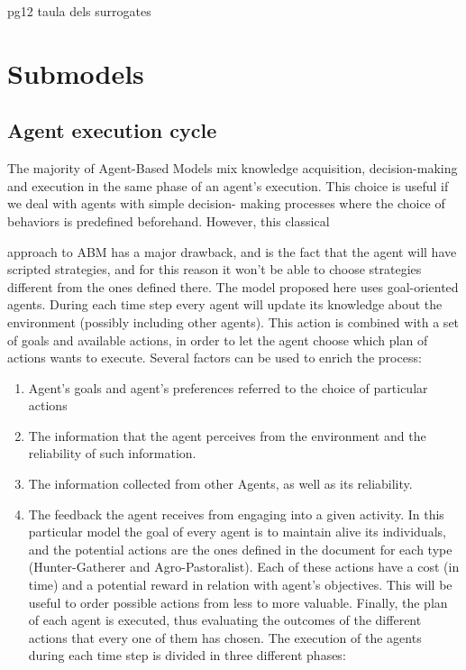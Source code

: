 pg12 taula dels surrogates

\section{Submodels}

\subsection{Agent execution cycle}
The majority of Agent-Based Models mix knowledge acquisition, decision-making and execution in the
same phase of an agent's execution. This choice is useful if we deal with agents with simple decision-
making processes where the choice of behaviors is predefined beforehand. However, this classical

approach to ABM has a major drawback, and is the fact that the agent will have scripted strategies,
and for this reason it won't be able to choose strategies different from the ones defined there.
The model proposed here uses goal-oriented agents. During each time step every agent will update its
knowledge about the environment (possibly including other agents). This action is combined with a set
of goals and available actions, in order to let the agent choose which plan of actions wants to execute.
Several factors can be used to enrich the process:

\begin{enumerate}
\item Agent's goals and agent's preferences referred to the choice of particular actions
\item The information that the agent perceives from the environment and the reliability of such
information.
\item The information collected from other Agents, as well as its reliability.
\item The feedback the agent receives from engaging into a given activity.
In this particular model the goal of every agent is to maintain alive its individuals, and the potential
actions are the ones defined in the document for each type (Hunter-Gatherer and Agro-Pastoralist).
Each of these actions have a cost (in time) and a potential reward in relation with agent's objectives.
This will be useful to order possible actions from less to more valuable. Finally, the plan of each agent
is executed, thus evaluating the outcomes of the different actions that every one of them has chosen.
The execution of the agents during each time step is divided in three different phases:
\end{enumerate}

